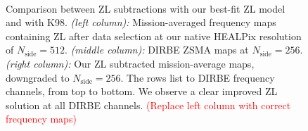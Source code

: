 \documentclass[twocolumn]{aa}
\begin{document}
\begin{figure}
    \\
    \caption{Comparison between ZL subtractions with our best-fit ZL model and with K98. 
    \textit{(left column):} Mission-averaged frequency maps containing ZL after data selection at our native HEALPix resolution 
    of $N_\mathrm{side} = 512$. \textit{(middle column):} DIRBE ZSMA maps
    at $N_\mathrm{side} = 256$.\textit{(right column):} Our ZL subtracted mission-average 
    maps, downgraded to $N_\mathrm{side} = 256$. The rows list to DIRBE frequency channels, from top to 
    bottom. We observe a clear improved ZL solution at all DIRBE channels. \textcolor{red}{(Replace left column with correct frequency maps)}
    }
    \label{fig:dr2-zsma-compare1}
\end{figure}
\end{document}
